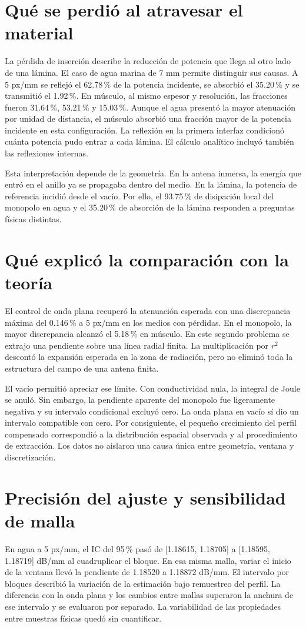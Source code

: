 \section{Qué se perdió al atravesar el material}
La pérdida de inserción describe la reducción de potencia que llega al otro lado de una lámina. El caso de agua marina de 7 mm permite distinguir sus causas. A 5 px/mm se reflejó el 62.78\,\% de la potencia incidente, se absorbió el 35.20\,\% y se transmitió el 1.92\,\%. En músculo, al mismo espesor y resolución, las fracciones fueron 31.64\,\%, 53.21\,\% y 15.03\,\%. Aunque el agua presentó la mayor atenuación por unidad de distancia, el músculo absorbió una fracción mayor de la potencia incidente en esta configuración. La reflexión en la primera interfaz condicionó cuánta potencia pudo entrar a cada lámina. El cálculo analítico incluyó también las reflexiones internas.

Esta interpretación depende de la geometría. En la antena inmersa, la energía que entró en el anillo ya se propagaba dentro del medio. En la lámina, la potencia de referencia incidió desde el vacío. Por ello, el 93.75\,\% de disipación local del monopolo en agua y el 35.20\,\% de absorción de la lámina responden a preguntas físicas distintas.

\section{Qué explicó la comparación con la teoría}
El control de onda plana recuperó la atenuación esperada con una discrepancia máxima del 0.146\,\% a 5 px/mm en los medios con pérdidas. En el monopolo, la mayor discrepancia alcanzó el 5.18\,\% en músculo. En este segundo problema se extrajo una pendiente sobre una línea radial finita. La multiplicación por $r^2$ descontó la expansión esperada en la zona de radiación, pero no eliminó toda la estructura del campo de una antena finita.

El vacío permitió apreciar ese límite. Con conductividad nula, la integral de Joule se anuló. Sin embargo, la pendiente aparente del monopolo fue ligeramente negativa y su intervalo condicional excluyó cero. La onda plana en vacío sí dio un intervalo compatible con cero. Por consiguiente, el pequeño crecimiento del perfil compensado correspondió a la distribución espacial observada y al procedimiento de extracción. Los datos no aislaron una causa única entre geometría, ventana y discretización.

\section{Precisión del ajuste y sensibilidad de malla}
En agua a 5 px/mm, el IC del 95\,\% pasó de [1.18615, 1.18705] a [1.18595, 1.18719] dB/mm al cuadruplicar el bloque. En esa misma malla, variar el inicio de la ventana llevó la pendiente de 1.18520 a 1.18872 dB/mm. El intervalo por bloques describió la variación de la estimación bajo remuestreo del perfil. La diferencia con la onda plana y los cambios entre mallas superaron la anchura de ese intervalo y se evaluaron por separado. La variabilidad de las propiedades entre muestras físicas quedó sin cuantificar.

